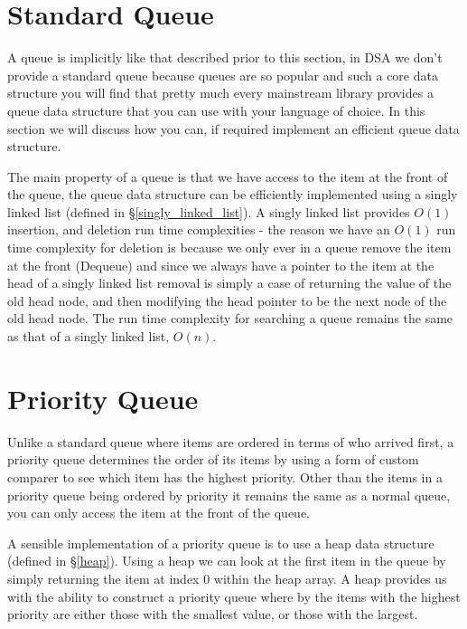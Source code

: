 \section{Standard Queue}
A queue is implicitly like that described prior to this section, in DSA we don't provide a standard queue because queues are so popular and such a core data structure you will find that pretty much every mainstream library provides a queue data structure that you can use with your language of choice. In this section we will discuss how you can, if required implement an efficient queue data structure.

The main property of a queue is that we have access to the item at the front of the queue, the queue data structure can be efficiently implemented using a singly linked list (defined in \S\ref{singly_linked_list}). A singly linked list provides $O(1)$ insertion, and deletion run time complexities - the reason we have an $O(1)$ run time complexity for deletion is because we only ever in a queue remove the item at the front (Dequeue) and since we always have a pointer to the item at the head of a singly linked list removal is simply a case of returning the value of the old head node, and then modifying the head pointer to be the next node of the old head node. The run time complexity for searching a queue remains the same as that of a singly linked list, $O(n)$.

\section{Priority Queue}
Unlike a standard queue where items are ordered in terms of who arrived first, a priority queue determines the order of its items by using a form of custom comparer to see which item has the highest priority. Other than the items in a priority queue being ordered by priority it remains the same as a normal queue, you can only access the item at the front of the queue.

A sensible implementation of a priority queue is to use a heap data structure (defined in \S\ref{heap}). Using a heap we can look at the first item in the queue by simply returning the item at index $0$ within the heap array. A heap provides us with the ability to construct a priority queue where by the items with the highest priority are either those with the smallest value, or those with the largest.
